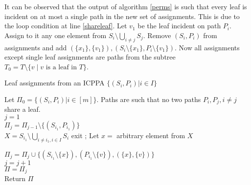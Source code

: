 \documentclass{llncs}
\begin{document}
\noindent
It can be observed that the output of algorithm \ref{perms} is such
that every leaf is incident on at most a single path in the new set of
assignments. This is due to the loop condition at line
\ref{shareleaf}. Let $v_1$ be the leaf incident on path $P_i$. Assign
to it any one element from $S_i \setminus \bigcup_{i \ne j}
S_j$. Remove $(S_i, P_i)$ from assignments and add $(\{x_1\},
\{v_1\}), (S_i \setminus \{x_1\}, P_i \setminus \{v_1\})$. Now all
assignments except single leaf assignments are paths from the subtree
$T_0 = T \setminus \{v \mid v \text{ is a leaf in } T\}$.


\begin{algorithm}[h]
\caption{Leaf assignments from an ICPPA $\{(S_i,P_i) | i \in I\}$}
\label{leafasgn}
\begin{algorithmic}
\STATE Let $\Pi_0=\{(S_i,P_i)| i \in [m]\}$. Paths are such that no
two paths $P_i, P_j, i \ne j$ share a leaf.\\
\STATE $j = 1$\\
\STATE $\Pi_j=   \Pi_{j-1} \setminus \{(S_{i_1}, P_{i_1})\}$\\
\STATE $X = S_{i_1} \setminus \bigcup_{i \ne i_1, i \in
  I}S_i$
\STATE exit 
\ENDIF;
\STATE Let $x = $ arbitrary element from $X$ \vspace{2mm}

\STATE $\Pi_j = \Pi_j \cup \{(S_{i_1} \setminus \{x\}),(P_{i_1} \setminus
  \{v\}), (\{x\},\{v\})\}$\\
\STATE $j = j+1$\\
\ENDWHILE
\STATE $\Pi = \Pi_j$\\
\STATE Return $\Pi$\\
\end{algorithmic}
\end{algorithm}
\end{document}
